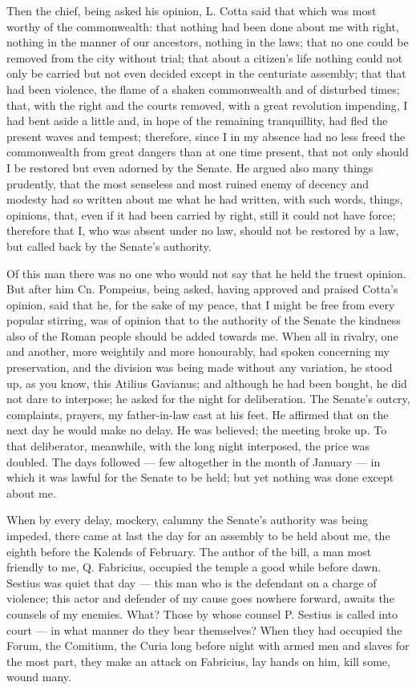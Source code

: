  Then the chief, being asked his opinion, L. Cotta said that which was most worthy of the commonwealth: that nothing had been done about me with right, nothing in the manner of our ancestors, nothing in the laws; that no one could be removed from the city without trial; that about a citizen's life nothing could not only be carried but not even decided except in the centuriate assembly; that that had been violence, the flame of a shaken commonwealth and of disturbed times; that, with the right and the courts removed, with a great revolution impending, I had bent aside a little and, in hope of the remaining tranquillity, had fled the present waves and tempest; therefore, since I in my absence had no less freed the commonwealth from great dangers than at one time present, that not only should I be restored but even adorned by the Senate. He argued also many things prudently, that the most senseless and most ruined enemy of decency and modesty had so written about me what he had written, with such words, things, opinions, that, even if it had been carried by right, still it could not have force; therefore that I, who was absent under no law, should not be restored by a law, but called back by the Senate's authority.

 Of this man there was no one who would not say that he held the truest opinion. But after him Cn. Pompeius, being asked, having approved and praised Cotta's opinion, said that he, for the sake of my peace, that I might be free from every popular stirring, was of opinion that to the authority of the Senate the kindness also of the Roman people should be added towards me. When all in rivalry, one and another, more weightily and more honourably, had spoken concerning my preservation, and the division was being made without any variation, he stood up, as you know, this Atilius Gavianus; and although he had been bought, he did not dare to interpose; he asked for the night for deliberation. The Senate's outcry, complaints, prayers, my father-in-law cast at his feet. He affirmed that on the next day he would make no delay. He was believed; the meeting broke up. To that deliberator, meanwhile, with the long night interposed, the price was doubled. The days followed --- few altogether in the month of January --- in which it was lawful for the Senate to be held; but yet nothing was done except about me.

 When by every delay, mockery, calumny the Senate's authority was being impeded, there came at last the day for an assembly to be held about me, the eighth before the Kalends of February. The author of the bill, a man most friendly to me, Q. Fabricius, occupied the temple a good while before dawn. Sestius was quiet that day --- this man who is the defendant on a charge of violence; this actor and defender of my cause goes nowhere forward, awaits the counsels of my enemies. What? Those by whose counsel P. Sestius is called into court --- in what manner do they bear themselves? When they had occupied the Forum, the Comitium, the Curia long before night with armed men and slaves for the most part, they make an attack on Fabricius, lay hands on him, kill some, wound many.

